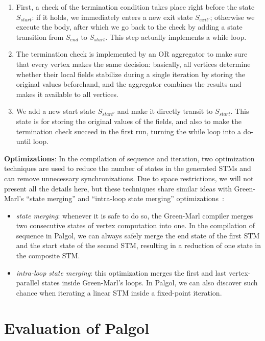 \documentclass{sokendai_thesis} %
\begin{document}
\begin{enumerate}
 \item 
  First, a check of the termination condition takes place right before the state $S_\mathit{start}$: if it holds, we immediately enters a new exit state $S_\mathit{exit'}$; otherwise we execute the body, after which we go back to the check by adding a state transition from $S_\mathit{end}$ to $S_\mathit{start}$.
  This step actually implements a while loop.
 \item
  The termination check is implemented by an OR aggregator to make sure that every vertex makes the same decision:
  basically, all vertices determine whether their local fields stabilize during a single iteration by storing the original values beforehand, and the aggregator combines the results and makes it available to all vertices.
 \item
  We add a new start state $S_\mathit{start'}$ and make it directly transit to $S_\mathit{start}$.
  This state is for storing the original values of the fields, and also to make the termination check succeed in the first run, turning the while loop into a do-until loop.
\end{enumerate}

\textbf{Optimizations}:
In the compilation of sequence and iteration, two optimization techniques are used to reduce the number of states in the generated STMs and can remove unnecessary synchronizations.
Due to space restrictions, we will not present all the details here, but these techniques share similar ideas with Green-Marl's ``state merging'' and ``intra-loop state merging'' optimizations~\cite{green14}:
\begin{itemize}
 \item \emph{state merging}:
  whenever it is safe to do so, the Green-Marl compiler merges two consecutive states of vertex computation into one.
  In the compilation of sequence in Palgol, we can always safely merge the end state of the first STM and the start state of the second STM, resulting in a reduction of one state in the composite STM.
 \item \emph{intra-loop state merging}:
  this optimization merges the first and last vertex-parallel states inside Green-Marl's loops.
  In Palgol, we can also discover such chance when iterating a linear STM inside a fixed-point iteration.
\end{itemize}

\section{Evaluation of Palgol}
\end{document}
